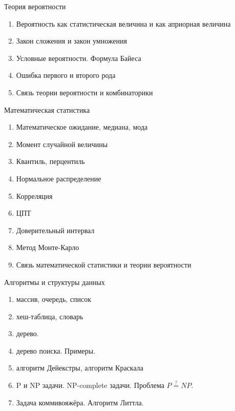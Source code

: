 \documentclass{beamer}
\begin{document}
  \begin{frame}{Теория вероятности}
  \begin{enumerate}
    \item Вероятность как статистическая величина и как априорная величина
    \item Закон сложения и закон умножения
    \item Условные вероятности. Формула Байеса
    \item Ошибка первого и второго рода
    \item Связь теории вероятности и комбинаторики
   \end{enumerate}
   \end{frame}
 
  \begin{frame}{Математическая статистика}
  \begin{enumerate}
    \item Математическое ожидание, медиана, мода
    \item Момент случайной величины
    \item Квантиль, перцентиль
    \item Нормальное распределение
    \item Корреляция
    \item ЦПТ
    \item Доверительный интервал
    \item Метод Монте-Карло
    \item Связь математической статистики и теории вероятности
 \end{enumerate}  
\end{frame}

  \begin{frame}{Алгоритмы и структуры данных}
   \begin{enumerate}
   	
     \item массив, очередь, список
     \item хеш-таблица, словарь
     \item дерево.
     \item дерево поиска. Примеры.
     \item алгоритм Дейекстры, алгоритм Краскала
     \item P и NP задачи. NP-complete задачи. Проблема $ P\stackrel{?}{=} NP$.
     \item Задача коммивояжёра. Алгоритм Литтла.     
	\end{enumerate}
  
	\end{frame}
  
\end{document}
